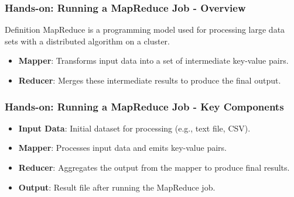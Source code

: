 \documentclass[aspectratio=169]{beamer}
\begin{document}
\begin{frame}[fragile]
    \frametitle{Hands-on: Running a MapReduce Job - Overview}
    \begin{block}{Definition}
        MapReduce is a programming model used for processing large data sets with a distributed algorithm on a cluster. 
    \end{block}
    \begin{itemize}
        \item \textbf{Mapper}: Transforms input data into a set of intermediate key-value pairs.
        \item \textbf{Reducer}: Merges these intermediate results to produce the final output.
    \end{itemize}
\end{frame}

\begin{frame}[fragile]
    \frametitle{Hands-on: Running a MapReduce Job - Key Components}
    \begin{itemize}
        \item \textbf{Input Data}: Initial dataset for processing (e.g., text file, CSV).
        \item \textbf{Mapper}: Processes input data and emits key-value pairs.
        \item \textbf{Reducer}: Aggregates the output from the mapper to produce final results.
        \item \textbf{Output}: Result file after running the MapReduce job.
    \end{itemize}
\end{frame}
\end{document}
